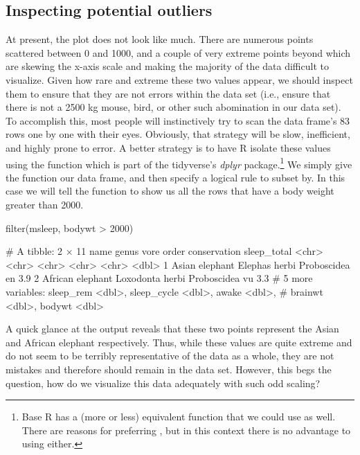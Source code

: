 \subsection{Inspecting potential outliers}

At present, the plot does not look like much.  There are numerous points scattered between 0 and 1000, and a couple of very extreme points beyond which are skewing the x-axis scale and making the majority of the data difficult to visualize. Given how rare and extreme these two values appear, we should inspect them to ensure that they are not errors within the data set (i.e., ensure that there is not a 2500 kg mouse, bird, or other such abomination in our data set). To accomplish this, most people will instinctively try to scan the data frame's 83 rows one by one with their eyes. Obviously, that strategy will be slow, inefficient, and highly prone to error.  A better strategy is to have R isolate these values using the  function which is part of the tidyverse's \textit{dplyr} package.\footnote{Base R has a (more or less) equivalent function  that we could use as well. There are reasons for preferring , but in this context there is no advantage to using either.}  We simply give the function our data frame, and then specify a logical rule to subset by. In this case we will tell the function to show us all the rows that have a body weight greater than 2000.

\begin{inR}
filter(msleep, bodywt > 2000)
\end{inR}

\begin{outR}
# A tibble: 2 × 11
  name             genus     vore  order       conservation sleep_total
  <chr>            <chr>     <chr> <chr>       <chr>              <dbl>
1 Asian elephant   Elephas   herbi Proboscidea en                   3.9
2 African elephant Loxodonta herbi Proboscidea vu                   3.3
# 5 more variables: sleep_rem <dbl>, sleep_cycle <dbl>, awake <dbl>, 
# brainwt <dbl>, bodywt <dbl>
\end{outR}

\vspace{1em}

A quick glance at the output reveals that these two points represent the Asian and African elephant respectively.  Thus, while these values are quite extreme and do not seem to be terribly representative of the data as a whole, they are not mistakes and therefore should remain in the data set.  However, this begs the question, how do we visualize this data adequately with such odd scaling?

